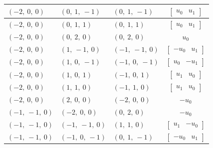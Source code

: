 \documentclass[11pt]{article}
\theoremstyle{definition}
\begin{document}
\begin{longtable}{|l|l|l|c|}
    \hline
    $\left( -2, \  0, \  0\right)$ & $\left( 0, \  1, \  -1\right)$ & $\left( 0, \  1, \  -1\right)$ & $\left[\begin{matrix}u_{0} & u_{1}\end{matrix}\right]$ \\
    \hline
    $\left( -2, \  0, \  0\right)$ & $\left( 0, \  1, \  1\right)$ & $\left( 0, \  1, \  1\right)$ & $\left[\begin{matrix}u_{0} & u_{1}\end{matrix}\right]$ \\
    \hline
    $\left( -2, \  0, \  0\right)$ & $\left( 0, \  2, \  0\right)$ & $\left( 0, \  2, \  0\right)$ & $u_{0}$ \\
    \hline
    $\left( -2, \  0, \  0\right)$ & $\left( 1, \  -1, \  0\right)$ & $\left( -1, \  -1, \  0\right)$ & $\left[\begin{matrix}- u_{0} & u_{1}\end{matrix}\right]$ \\
    \hline
    $\left( -2, \  0, \  0\right)$ & $\left( 1, \  0, \  -1\right)$ & $\left( -1, \  0, \  -1\right)$ & $\left[\begin{matrix}u_{0} & - u_{1}\end{matrix}\right]$ \\
    \hline
    $\left( -2, \  0, \  0\right)$ & $\left( 1, \  0, \  1\right)$ & $\left( -1, \  0, \  1\right)$ & $\left[\begin{matrix}u_{1} & u_{0}\end{matrix}\right]$ \\
    \hline
    $\left( -2, \  0, \  0\right)$ & $\left( 1, \  1, \  0\right)$ & $\left( -1, \  1, \  0\right)$ & $\left[\begin{matrix}u_{1} & u_{0}\end{matrix}\right]$ \\
    \hline
    $\left( -2, \  0, \  0\right)$ & $\left( 2, \  0, \  0\right)$ & $\left( -2, \  0, \  0\right)$ & $- u_{0}$ \\
    \hline
    $\left( -1, \  -1, \  0\right)$ & $\left( -2, \  0, \  0\right)$ & $\left( 0, \  2, \  0\right)$ & $- u_{0}$ \\
    \hline
    $\left( -1, \  -1, \  0\right)$ & $\left( -1, \  -1, \  0\right)$ & $\left( 1, \  1, \  0\right)$ & $\left[\begin{matrix}u_{1} & - u_{0}\end{matrix}\right]$ \\
    \hline
    $\left( -1, \  -1, \  0\right)$ & $\left( -1, \  0, \  -1\right)$ & $\left( 0, \  1, \  -1\right)$ & $\left[\begin{matrix}- u_{0} & u_{1}\end{matrix}\right]$ \\

\end{longtable}
\end{document}
